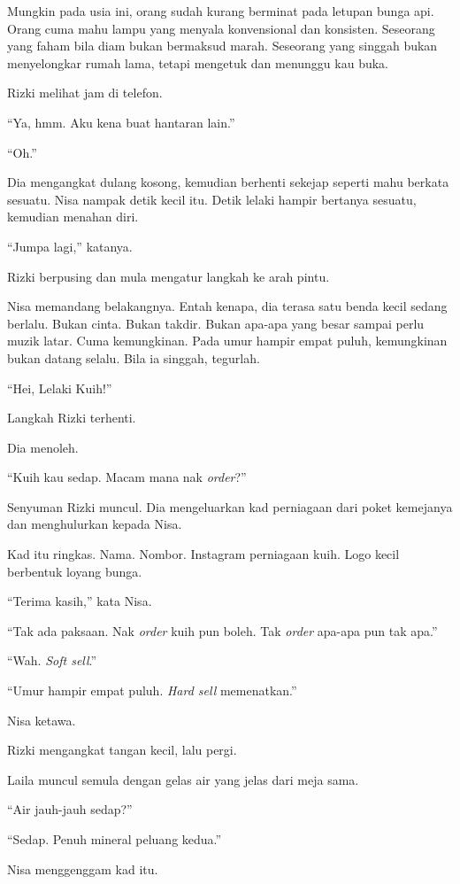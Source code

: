 \documentclass[
  11pt,
  a5paper,
  openany,
  oneside]{book}
\begin{document}
Mungkin pada usia ini, orang sudah kurang berminat pada letupan bunga
api. Orang cuma mahu lampu yang menyala konvensional dan konsisten.
Seseorang yang faham bila diam bukan bermaksud marah. Seseorang yang
singgah bukan menyelongkar rumah lama, tetapi mengetuk dan menunggu kau
buka.

Rizki melihat jam di telefon.

``Ya, hmm. Aku kena buat hantaran lain.''

``Oh.''

Dia mengangkat dulang kosong, kemudian berhenti sekejap seperti mahu
berkata sesuatu. Nisa nampak detik kecil itu. Detik lelaki hampir
bertanya sesuatu, kemudian menahan diri.

``Jumpa lagi,'' katanya.

Rizki berpusing dan mula mengatur langkah ke arah pintu.

Nisa memandang belakangnya. Entah kenapa, dia terasa satu benda kecil
sedang berlalu. Bukan cinta. Bukan takdir. Bukan apa-apa yang besar
sampai perlu muzik latar. Cuma kemungkinan. Pada umur hampir empat
puluh, kemungkinan bukan datang selalu. Bila ia singgah, tegurlah.

``Hei, Lelaki Kuih!''

Langkah Rizki terhenti.

Dia menoleh.

``Kuih kau sedap. Macam mana nak \emph{order}?''

Senyuman Rizki muncul. Dia mengeluarkan kad perniagaan dari poket
kemejanya dan menghulurkan kepada Nisa.

Kad itu ringkas. Nama. Nombor. Instagram perniagaan kuih. Logo kecil
berbentuk loyang bunga.

``Terima kasih,'' kata Nisa.

``Tak ada paksaan. Nak \emph{order} kuih pun boleh. Tak \emph{order}
apa-apa pun tak apa.''

``Wah. \emph{Soft sell}.''

``Umur hampir empat puluh. \emph{Hard sell} memenatkan.''

Nisa ketawa.

Rizki mengangkat tangan kecil, lalu pergi.

Laila muncul semula dengan gelas air yang jelas dari meja sama.

``Air jauh-jauh sedap?''

``Sedap. Penuh mineral peluang kedua.''

Nisa menggenggam kad itu.
\end{document}
